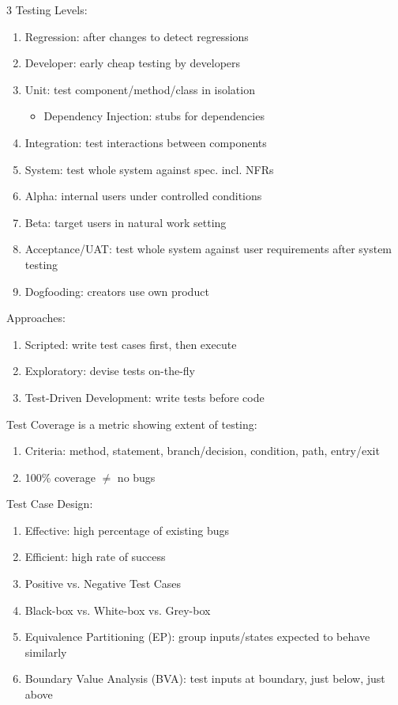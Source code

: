 \documentclass[12pt, a4paper]{article}
\begin{document}
\begin{multicols*}{3}
Testing Levels:
\begin{enumerate}[\roman*.]
  \item Regression: after changes to detect regressions
  \item Developer: early cheap testing by developers
  \item Unit: test component/method/class in isolation
    \begin{itemize}[leftmargin=*]\vspace{3pt}
      \item Dependency Injection: stubs for dependencies
    \end{itemize}
  \item Integration: test interactions between components
  \item System: test whole system against spec. incl. NFRs
  \item Alpha: internal users under controlled conditions
  \item Beta: target users in natural work setting
  \item Acceptance/UAT: test whole system against user requirements after system testing
  \item Dogfooding: creators use own product
\end{enumerate}

Approaches:
\begin{enumerate}[\roman*.]
  \item Scripted: write test cases first, then execute
  \item Exploratory: devise tests on-the-fly
  \item Test-Driven Development: write tests before code
\end{enumerate}

Test Coverage is a metric showing extent of testing:
\begin{enumerate}[\roman*.]
  \item Criteria: method, statement, branch/decision, condition, path, entry/exit
  \item 100\% coverage $\neq$ no bugs
\end{enumerate}

Test Case Design:
\begin{enumerate}[\roman*.]
  \item Effective: high percentage of existing bugs 
  \item Efficient: high rate of success
  \item Positive vs. Negative Test Cases
  \item Black-box vs. White-box vs. Grey-box
  \item Equivalence Partitioning (EP): group inputs/states expected to behave similarly
  \item Boundary Value Analysis (BVA): test inputs at boundary, just below, just above
\end{enumerate}


\end{multicols*}
\end{document}
